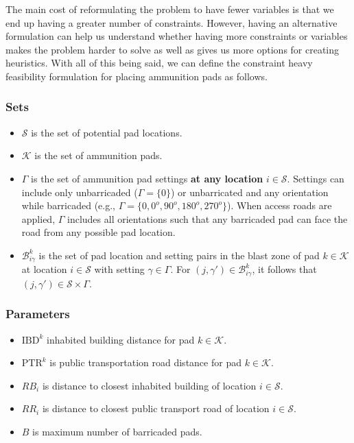 \documentclass[10pt]{article}
\begin{document}
	The main cost of reformulating the problem to have fewer variables is that we end up having a greater number of constraints. However, having an alternative formulation can help us understand whether having more constraints or variables makes the problem harder to solve as well as gives us more options for creating heuristics. With all of this being said, we can define the constraint heavy feasibility formulation for placing ammunition pads as follows.
	
	\subsubsection{Sets}
	\begin{itemize}
		\item $\mathcal{S}$ is the set of potential pad locations.
		\item $\mathcal{K}$ is the set of ammunition pads.
		\item $\Gamma$ is the set of ammunition pad settings {\bf at any location} $ i \in \mathcal{S}$. Settings can include only unbarricaded ($\Gamma = \{0\}$) or unbarricated and any orientation while barricaded (e.g., $\Gamma = \{0, 0^o, 90^o, 180^o, 270^o\}$). When access roads are applied, $ \Gamma $ includes all orientations such that any barricaded pad can face the road from any possible pad location.
		\item $ \mathcal{B}_{i\gamma}^{k} $ is the set of pad location and setting pairs in the blast zone of pad $ k \in \mathcal{K}$ at location $ i \in \mathcal{S}$ with setting $ \gamma \in \Gamma $. For $ (j, \gamma') \in \mathcal{B}_{i\gamma}^{k} $, it follows that $ (j, \gamma') \in \mathcal{S} \times \Gamma $.
		 \end{itemize}
	
	\subsubsection{Parameters}
	\begin{itemize}
		\item $\text{IBD}^k$ inhabited building distance for pad $ k \in \mathcal{K}$.
		\item $\text{PTR}^k$ is public transportation road distance for pad $ k \in \mathcal{K}$.
		\item $ RB_i $ is distance to closest inhabited building of location $i \in \mathcal{S}$.
		\item $ RR_i $ is distance to closest public transport road of location $i \in \mathcal{S}$.
		\item $ B $ is maximum number of barricaded pads.
	\end{itemize}
	
\end{document}
